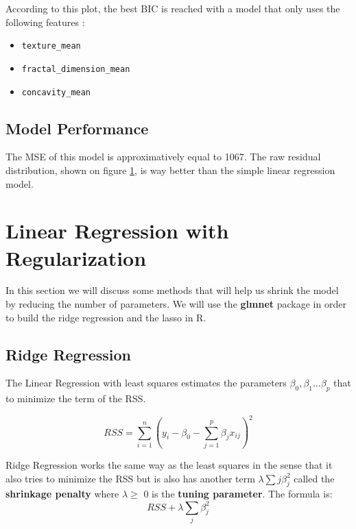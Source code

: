 \documentclass[]{report}
\newcommand{\inputtikz}[2]{%
	\scalebox{#1}{}  
}
\begin{document}
According to this plot, the best BIC is reached with a model that only uses the following features : 
\begin{itemize}
	\item \texttt{texture\_mean}
	\item \texttt{fractal\_dimension\_mean}
	\item \texttt{concavity\_mean}
\end{itemize}

\subsection{Model Performance}
The MSE of this model is approximatively equal to 1067. The raw residual distribution, shown on figure \ref{fig:subset_hist}, is way better than the simple linear regression model.

\begin{figure}[!h]
	\centering
	\inputtikz{0.5}{Figures/subset_hist.tex}

	\caption{}
	\label{fig:subset_hist}
\end{figure}

\section{Linear Regression with Regularization}
In this section we will discuss some methods that will help us shrink the model by reducing the number of parameters.
We will use the \textbf{glmnet} package in order to build the ridge regression and the lasso in R.

\subsection{Ridge Regression}
The Linear Regression with least squares estimates the parameters $\beta_{0},\beta_{1}...\beta_{p}$ that to minimize the term of the RSS.
\begin{center}
	$$ RSS = \sum_{i=1}^{n}(y_{i} - \beta_{0} - \sum_{j=1}^{p}\beta_{j}x_{ij})^{2} $$
\end{center}

Ridge Regression works the same way as the least squares in the sense that it also tries to minimize the RSS but is also has another term $\lambda \sum{j}\beta_{j}^{2}$ called the \textbf{shrinkage penalty} where $\lambda\geq$ 0 is the \textbf{ tuning parameter}. The formula is:
		\begin{equation} \label{eq1}
		  RSS + \lambda \sum_{j}\beta_{j}^{2}
		\end{equation}			
\end{document}
